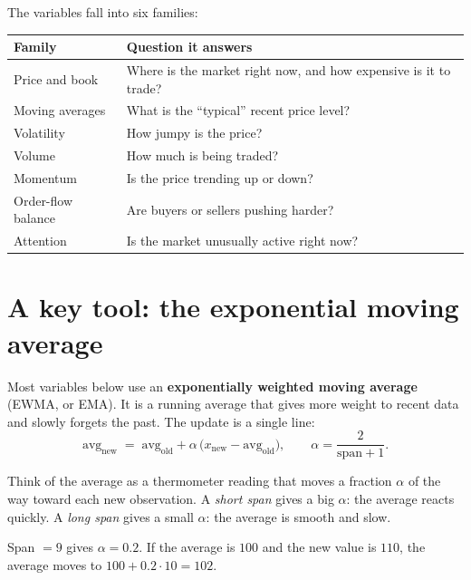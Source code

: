 \documentclass[11pt,a4paper]{article}
\begin{document}
The variables fall into six families:

\begin{center}
\renewcommand{\arraystretch}{1.25}
\begin{tabular}{@{}L{3.6cm}L{10.6cm}@{}}
\toprule
\textbf{Family} & \textbf{Question it answers}\\
\midrule
Price and book    & Where is the market right now, and how expensive is it to trade?\\
Moving averages   & What is the ``typical'' recent price level?\\
Volatility        & How jumpy is the price?\\
Volume            & How much is being traded?\\
Momentum          & Is the price trending up or down?\\
Order-flow balance& Are buyers or sellers pushing harder?\\
Attention         & Is the market unusually active right now?\\
\bottomrule
\end{tabular}
\end{center}

\section{A key tool: the exponential moving average}
\label{sec:ewma}

Most variables below use an \textbf{exponentially weighted moving average} (EWMA, or EMA). It is a
running average that gives more weight to recent data and slowly forgets the past. The update is a
single line:
\begin{equation}
  \text{avg}_{\text{new}} \;=\; \text{avg}_{\text{old}} + \alpha\,\bigl(x_{\text{new}} - \text{avg}_{\text{old}}\bigr),
  \qquad \alpha = \frac{2}{\text{span}+1}.
  \label{eq:ewma}
\end{equation}

\begin{intuition}
Think of the average as a thermometer reading that moves a fraction $\alpha$ of the way toward each
new observation. A \emph{short span} gives a big $\alpha$: the average reacts quickly. A \emph{long
span} gives a small $\alpha$: the average is smooth and slow.
\end{intuition}

\begin{example}
Span $=9$ gives $\alpha = 0.2$. If the average is $100$ and the new value is $110$, the average
moves to $100 + 0.2\cdot 10 = 102$.
\end{example}
\end{document}
